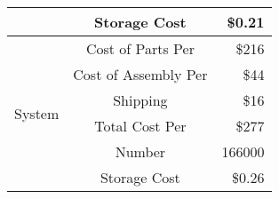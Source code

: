 {\begin{longtable}[c]{|c|c|r|}
                         & Storage Cost         & \$0.21\\\hline\hline
\multirow{6}{*}{System} & Cost of Parts Per    & \$216\\\cline{2-3}
                        & Cost of Assembly Per & \$44\\\cline{2-3}
                        & Shipping             & \$16\\\cline{2-3}
                        & Total Cost Per       & \$277\\\cline{2-3}
                        & Number               & 166000\\\cline{2-3}
                        & Storage Cost         & \$0.26\\\hline\hline

\end{longtable}
}
